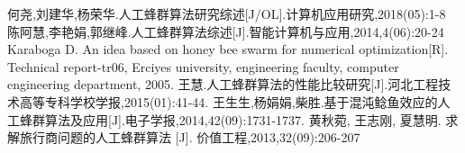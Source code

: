 \documentclass[a4paper,12pt]{report}
\begin{document}

\begin{thebibliography}{99}
\songti {} 	

	 何尧,刘建华,杨荣华.人工蜂群算法研究综述[J/OL].计算机应用研究,2018(05):1-8
	 陈阿慧,李艳娟,郭继峰.人工蜂群算法综述[J].智能计算机与应用,2014,4(06):20-24
	 Karaboga D. An idea based on honey bee swarm for numerical optimization[R]. Technical report-tr06, Erciyes university, engineering faculty, computer engineering department, 2005.
	 王慧.人工蜂群算法的性能比较研究[J].河北工程技术高等专科学校学报,2015(01):41-44.
	 王生生,杨娟娟,柴胜.基于混沌鲶鱼效应的人工蜂群算法及应用[J].电子学报,2014,42(09):1731-1737.
	 黄秋菀, 王志刚, 夏慧明. 求解旅行商问题的人工蜂群算法 [J]. 价值工程,2013,32(09):206-207
	
\end{thebibliography}
\end{document}

